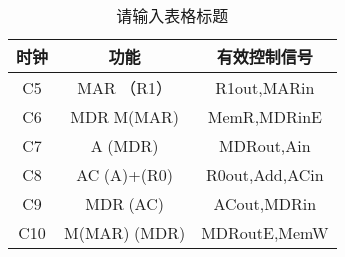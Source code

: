 \begin{table}[ht]
\centering
\caption{请输入表格标题}\label{CSN09_tab7}
\begin{tabular}{|c|c|c|}
\hline
时钟&功能&有效控制信号 \\
\hline
C5&MAR（R1）&R1out,MARin \\
\hline
C6&MDRM(MAR)&MemR,MDRinE \\
\hline
C7&A(MDR)&MDRout,Ain \\
\hline
C8&AC(A)+(R0)&R0out,Add,ACin \\
\hline
C9&MDR(AC)&ACout,MDRin \\
\hline
C10&M(MAR)(MDR)&MDRoutE,MemW \\
\hline
\end{tabular}
\end{table}

